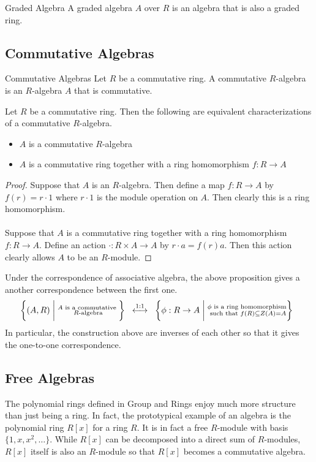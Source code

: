 \documentclass[a4paper]{article}
\begin{document}
\begin{defn}{Graded Algebra}{} A graded algebra $A$ over $R$ is an algebra that is also a graded ring. 
\end{defn}

\subsection{Commutative Algebras}
\begin{defn}{Commutative Algebras}{} Let $R$ be a commutative ring. A commutative $R$-algebra is an $R$-algebra $A$ that is commutative. 
\end{defn}

\begin{prp}{}{} Let $R$ be a commutative ring. Then the following are equivalent characterizations of a commutative $R$-algebra. 
\begin{itemize}
\item $A$ is a commutative $R$-algebra
\item $A$ is a commutative ring together with a ring homomorphism $f:R\to A$
\end{itemize}\tcbline
\begin{proof}
Suppose that $A$ is an $R$-algebra. Then define a map $f:R\to A$ by $f(r)=r\cdot 1$ where $r\cdot 1$ is the module operation on $A$. Then clearly this is a ring homomorphism. \\~\\
Suppose that $A$ is a commutative ring together with a ring homomorphism $f:R\to A$. Define an action $\cdot:R\times A\to A$ by $r\cdot a=f(r)a$. Then this action clearly allows $A$ to be an $R$-module. 
\end{proof}
\end{prp}

Under the correspondence of associative algebra, the above proposition gives a another correspondence between the first one. $$\left\{(A,R)\;\bigg{|}\;\substack{A\text{ is a commutative }\\R\text{-algebra}}\right\}\;\;\overset{1:1}{\longleftrightarrow}\;\;\left\{\phi:R\to A\;\bigg{|}\;\substack{\phi\text{ is a ring homomorphism}\\\text{ such that }f(R)\subseteq Z(A)=A}\right\}\;\;$$ In particular, the construction above are inverses of each other so that it gives the one-to-one correspondence. 

\subsection{Free Algebras}
The polynomial rings defined in Group and Rings enjoy much more structure than just being a ring. In fact, the prototypical example of an algebra is the polynomial ring $R[x]$ for a ring $R$. It is in fact a free $R$-module with basis $\{1,x,x^2,\dots\}$. While $R[x]$ can be decomposed into a direct sum of $R$-modules, $R[x]$ itself is also an $R$-module so that $R[x]$ becomes a commutative algebra. 
\end{document}
